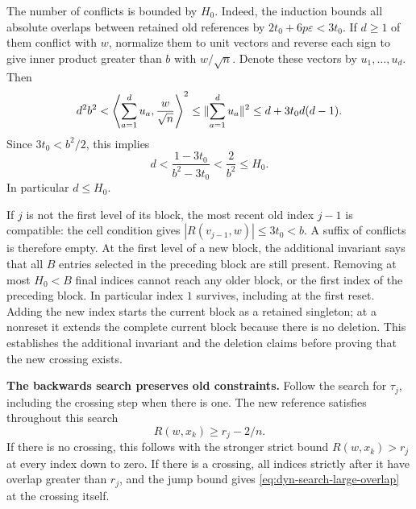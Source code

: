 The number of conflicts is bounded by $H_0$. Indeed, the induction
bounds all absolute overlaps between retained old references by
$2t_0+6p\varepsilon<3t_0$. If $d\geq1$ of them conflict with $w$,
normalize them to unit vectors and reverse each sign to give inner
product greater than $b$ with $w/\sqrt n$. Denote these vectors by
$u_1,\ldots,u_d$. Then
\[
 d^2b^2<\left\langle\sum_{a=1}^d u_a,\frac{w}{\sqrt n}\right\rangle^2
 \leq\lVert \sum_{a=1}^d u_a\rVert^2
 \leq d+3t_0d(d-1).
\]
Since $3t_0<b^2/2$, this implies
\[
 d<\frac{1-3t_0}{b^2-3t_0}<\frac{2}{b^2}\leq H_0.
\]
In particular $d\leq H_0$.

If $j$ is not the first level of its block, the most recent old index
$j-1$ is compatible: the cell condition gives
$|R(v_{j-1},w)|\leq3t_0<b$. A suffix of conflicts is therefore empty.
At the first level of a new block, the additional invariant says that
all $B$ entries selected in the preceding block are still present. Removing at most $H_0<B$ final indices
cannot reach any older block, or the first index of the preceding block.
In particular index $1$ survives, including at the first reset. Adding the new index starts the current block as a retained singleton;
at a nonreset it extends the complete current block because there is no
deletion. This establishes the additional invariant and the deletion
claims before proving that the new crossing exists.

\par\medskip\noindent\textbf{The backwards search preserves old constraints.}\enspace
Follow the search for $\tau_j$, including the crossing step when there
is one. The new reference satisfies throughout this search
\begin{equation}\label{eq:dyn-search-large-overlap}
 R(w,x_k)\geq r_j-2/n.
\end{equation}
If there is no crossing, this follows with the stronger strict bound
$R(w,x_k)>r_j$ at every index down to zero. If there is a crossing, all
indices strictly after it have overlap greater than $r_j$, and the jump
bound gives \eqref{eq:dyn-search-large-overlap} at the crossing itself.

